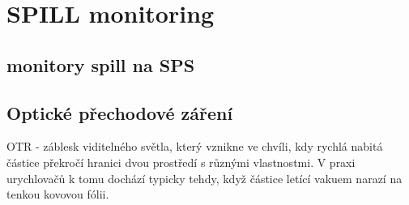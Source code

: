 %
%
%



\section{SPILL monitoring}

\subsection{monitory spill na SPS}
\subsection{Optické přechodové záření}
OTR - záblesk viditelného světla, který vznikne ve chvíli, kdy rychlá nabitá částice překročí hranici dvou prostředí s různými vlastnostmi. V praxi urychlovačů k tomu dochází typicky tehdy, když částice letící vakuem narazí na tenkou kovovou fólii.

